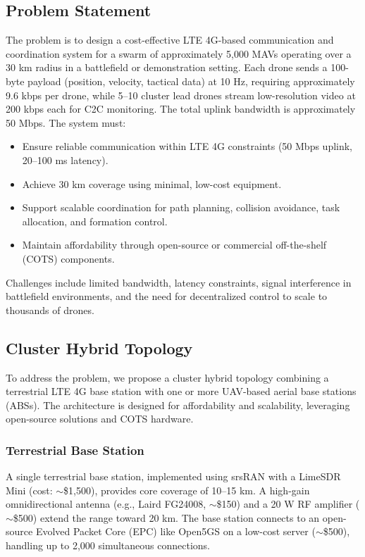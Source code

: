 \documentclass{article}
\begin{document}
\subsection{Problem Statement}
The problem is to design a cost-effective LTE 4G-based communication and coordination system for a swarm of approximately 5,000 MAVs operating over a 30 km radius in a battlefield or demonstration setting. Each drone sends a 100-byte payload (position, velocity, tactical data) at 10 Hz, requiring approximately 9.6 kbps per drone, while 5--10 cluster lead drones stream low-resolution video at 200 kbps each for C2C monitoring. The total uplink bandwidth is approximately 50 Mbps. The system must:
\begin{itemize}
    \item Ensure reliable communication within LTE 4G constraints (50 Mbps uplink, 20--100 ms latency).
    \item Achieve 30 km coverage using minimal, low-cost equipment.
    \item Support scalable coordination for path planning, collision avoidance, task allocation, and formation control.
    \item Maintain affordability through open-source or commercial off-the-shelf (COTS) components.
\end{itemize}
Challenges include limited bandwidth, latency constraints, signal interference in battlefield environments, and the need for decentralized control to scale to thousands of drones.

\subsection{Cluster Hybrid Topology}
To address the problem, we propose a cluster hybrid topology combining a terrestrial LTE 4G base station with one or more UAV-based aerial base stations (ABSs). The architecture is designed for affordability and scalability, leveraging open-source solutions and COTS hardware.

\subsubsection{Terrestrial Base Station}
A single terrestrial base station, implemented using srsRAN with a LimeSDR Mini (cost: $\sim$\$1,500), provides core coverage of 10--15 km. A high-gain omnidirectional antenna (e.g., Laird FG24008, $\sim$\$150) and a 20 W RF amplifier ($\sim$\$500) extend the range toward 20 km. The base station connects to an open-source Evolved Packet Core (EPC) like Open5GS on a low-cost server ($\sim$\$500), handling up to 2,000 simultaneous connections.
\end{document}
